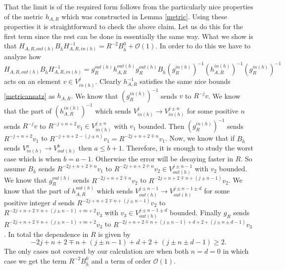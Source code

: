 \documentclass[12pt,oneside,reqno]{amsart}
\theoremstyle{definition}
\numberwithin{equation}{section}
\numberwithin{theorem}{section}
\begin{document}
That the limit is of the required form follows from the particularly nice properties of the metric $h_{A,R}$ which was constructed in Lemma \ref{metric}. Using these properties it is straightforward to check the above claim. Let us do this for the first term since the rest can be done in essentially the same way. What we show is that 
$H_{A,R,out(h)}B_{\bar h} H_{A,R,in(h)}^{-1} = R^{-2}B^0_{\bar h} + \mathcal O(1)$. In order to do this we have to analyze how 
%
\begin{equation}
H_{A,R,out(h)}B_{\bar h} H_{A,R,in(h)}^{-1}  =g_R^{out(h)}h_{A,R}^{out(h)}g_R^{out(h)}B_{\bar h}(g_R^{in(h)})^{-1}(h_{A,R}^{in(h)})^{-1}(g_R^{in(h)})^{-1}
\end{equation}
%
acts on an element $v\in V_{in(h)}^j$. Clearly $h_{A,R}^{-1}$ satisfies the same nice bounds \eqref{metricansatz} as $h_{A,R}$. We know that $ (g_R^{in(h)})^{-1}$ sends $v$ to $R^{-j}v$. We know that the part of $(h_{A,R}^{in(h)})^{-1}$ which sends $V_{in(h)}^j \to V_{in(h)}^{j\pm n}$ for some positive $n$ sends $R^{-j}v$ to $R^{-j + n+2}v_1 \in V_{in(h)}^{j\pm n}$ with $v_1$ bounded. Then $(g_R^{in(h)})^{-1}$ sends $R^{-j + n+2}v_1$ to $R^{-j + n+2-(j\pm n)}v_1 = R^{-2j + n+2\mp n}v_1$. Now, we know that if $B_{\bar h}$ sends $V_{in(h)}^a \to V_{out(h)}^b$ then $a\le b+1$. Therefore, it is enough to study the worst case which is when $b=a-1$. Otherwise the error will be decaying faster in $R$. So assume $B_{\bar h}$ sends $R^{-2j + n+2\mp n}v_1$ to $R^{-2j + n+2\mp n}v_2 \in V_{out(h)}^{j\pm n-1}$ with $v_2$ bounded. We know that $g_R^{out(h)}$ sends $R^{-2j + n+2\mp n}v_2$ to $R^{-2j + n+2\mp n +(j\pm n-1)}v_2$. We know that the part of $h_{A,R}^{out(h)}$ which sends $V_{out(h)}^{j\pm n-1} \to V_{out(h)}^{j\pm n-1 \pm d}$ for some positive integer $d$ sends $R^{-2j + n+2\mp n +(j\pm n-1)}v_2$ to $R^{-2j + n+2\mp n +(j\pm n-1)+m+2}v_3$ with $v_3\in V_{out(h)}^{j\pm n-1 \pm d}$ bounded. Finally $g_R$ sends $R^{-2j + n+2\mp n +(j\pm n-1)+m+2}v_3$ to $R^{-2j + n+2\mp n +(j\pm n-1)+d+2 +(j \pm n \pm d -1)}v_3$. In total the dependence in $R$ is given by 
%
\begin{equation}
-2j + n+2\mp n +(j\pm n-1)+d+2 +(j\pm n \pm d -1) \ge  2.
\end{equation}
%
The only cases not covered by our calculation are when both $n=d=0$ in which case we get the term $R^{-2}B_{\bar h}^0$ and a term of order $\mathcal O(1)$. 
\end{document}
